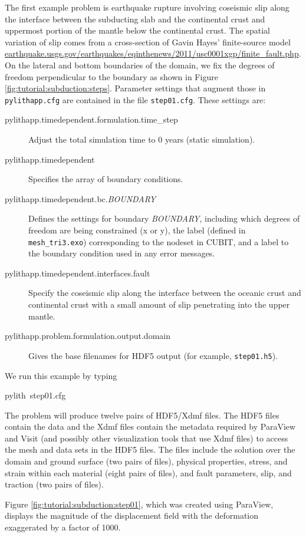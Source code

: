 The first example problem is earthquake rupture involving coseismic
slip along the interface between the subducting slab and the continental
crust and uppermost portion of the mantle below the continental crust.
The spatial variation of slip comes from a cross-section of Gavin
Hayes' finite-source model \url{earthquake.usgs.gov/earthquakes/eqinthenews/2011/usc0001xgp/finite_fault.php}.
On the lateral and bottom boundaries of the domain, we fix the degrees
of freedom perpendicular to the boundary as shown in Figure \ref{fig:tutorial:subduction:steps}.
Parameter settings that augment those in \texttt{pylithapp.cfg} are
contained in the file \texttt{step01.cfg}. These settings are:
\begin{description}
\item [{pylithapp.timedependent.formulation.time\_step}] Adjust the total
simulation time to 0 years (static simulation).
\item [{pylithapp.timedependent}] Specifies the array of boundary conditions.
\item [{pylithapp.timedependent.bc.\textit{BOUNDARY}}] Defines the settings
for boundary \textit{BOUNDARY}, including which degrees of freedom
are being constrained (x or y), the label (defined in\texttt{ mesh\_tri3.exo})
corresponding to the nodeset in CUBIT, and a label to the boundary
condition used in any error messages.
\item [{pylithapp.timedependent.interfaces.fault}] Specify the coseismic
slip along the interface between the oceanic crust and continental
crust with a small amount of slip penetrating into the upper mantle.
\item [{pylithapp.problem.formulation.output.domain}] Gives the base filenames
for HDF5 output (for example, \texttt{step01.h5}).
\end{description}
We run this example by typing
\begin{lyxcode}
pylith~step01.cfg
\end{lyxcode}
The problem will produce twelve pairs of HDF5/Xdmf files. The HDF5
files contain the data and the Xdmf files contain the metadata required
by ParaView and Visit (and possibly other visualization tools that
use Xdmf files) to access the mesh and data sets in the HDF5 files.
The files include the solution over the domain and ground surface
(two pairs of files), physical properties, stress, and strain within
each material (eight pairs of files), and fault parameters, slip,
and traction (two pairs of files). 

Figure \ref{fig:tutorial:subduction:step01}, which was created using
ParaView, displays the magnitude of the displacement field with the
deformation exaggerated by a factor of 1000. 

